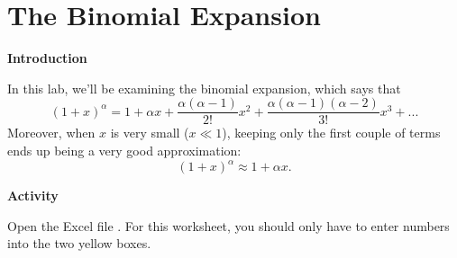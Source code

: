 \section{The Binomial Expansion}

\label{binomial_expansion_lab}
\makelabheader %

\bigskip

\textbf{Introduction}

In this lab, we'll be examining the binomial expansion, which says that
\begin{equation}
(1+x)^\alpha=1+\alpha x+\frac{\alpha(\alpha-1)}{2!} x^2+\frac{\alpha(\alpha-1)(\alpha-2)}{3!} x^3+...
\end{equation} 
Moreover, when $x$ is very small ($x \ll 1$),  keeping only the first couple of terms ends up being a very good approximation:
\begin{equation}
(1+x)^\alpha \approx 1+\alpha x .
\end{equation}

\medskip
\textbf{Activity}

Open the Excel file .  For this worksheet, you should only have to enter numbers into the two yellow boxes.

